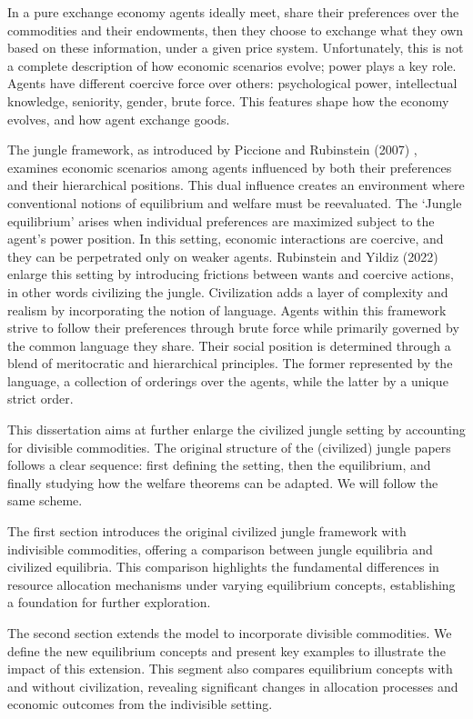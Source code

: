 \documentclass[12pt,a4paper]{article}
\numberwithin{theorem}{section}
\numberwithin{definition}{section}
\numberwithin{example}{section}
\numberwithin{exercise}{section}
\begin{document}
In a pure exchange economy agents ideally meet, share their preferences over the commodities and their endowments, then they choose to exchange what they own based on these information, under a given price system. Unfortunately, this is not a complete description of how economic scenarios evolve; power plays a key role. Agents have different coercive force over others: psychological power, intellectual knowledge, seniority, gender, brute force. This features shape how the economy evolves, and how agent exchange goods.   

The jungle framework, as introduced by Piccione and Rubinstein (2007) \cite[PR]{P-R}, examines economic scenarios among agents influenced by both their preferences and their hierarchical positions. This dual influence creates an environment where conventional notions of equilibrium and welfare must be reevaluated. The `Jungle equilibrium' arises when individual preferences are maximized subject to the agent's power position. In this setting, economic interactions are coercive, and they can be perpetrated only on weaker agents. Rubinstein and Yildiz (2022) \cite[RY]{RY} enlarge this setting by introducing frictions between wants and coercive actions, in other words civilizing the jungle. Civilization adds a layer of complexity and realism by incorporating the notion of language. Agents within this framework strive to follow their preferences through brute force while primarily governed by the common language they share. Their social position is determined through a blend of meritocratic and hierarchical principles. The former represented by the language, a collection of orderings over the agents, while the latter by a unique strict order.

This dissertation aims at further enlarge the civilized jungle setting by accounting for divisible commodities. The original structure of the (civilized) jungle papers follows a clear sequence: first defining the setting, then the equilibrium, and finally studying how the welfare theorems can be adapted. We will follow the same scheme.

The first section introduces the original civilized jungle framework with indivisible commodities, offering a comparison between jungle equilibria and civilized equilibria. This comparison highlights the fundamental differences in resource allocation mechanisms under varying equilibrium concepts, establishing a foundation for further exploration.

The second section extends the model to incorporate divisible commodities. We define the new equilibrium concepts and present key examples to illustrate the impact of this extension. This segment also compares equilibrium concepts with and without civilization, revealing significant changes in allocation processes and economic outcomes from the indivisible setting.
\end{document}
